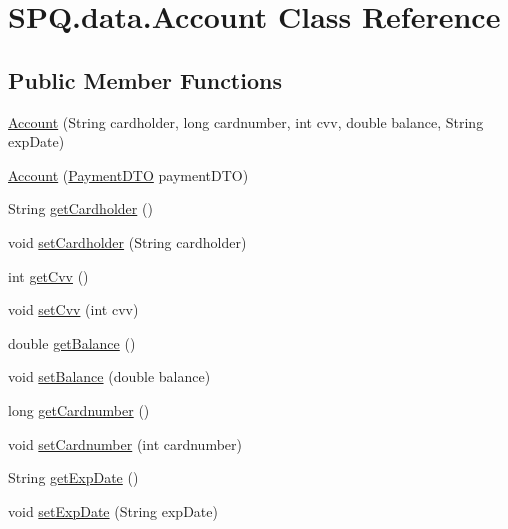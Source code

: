 \hypertarget{class_s_p_q_1_1data_1_1_account}{}\section{S\+P\+Q.\+data.\+Account Class Reference}
\label{class_s_p_q_1_1data_1_1_account}
\subsection*{Public Member Functions}
\begin{DoxyCompactItemize}
\item 
\mbox{\hyperlink{class_s_p_q_1_1data_1_1_account_a11f422d8f96b08c185afde5c34e67f01}{Account}} (String cardholder, long cardnumber, int cvv, double balance, String exp\+Date)
\item 
\mbox{\hyperlink{class_s_p_q_1_1data_1_1_account_a0d4661bfe533c8e38fc996747f3a4952}{Account}} (\mbox{\hyperlink{class_s_p_q_1_1dto_1_1_payment_d_t_o}{Payment\+D\+TO}} payment\+D\+TO)
\item 
String \mbox{\hyperlink{class_s_p_q_1_1data_1_1_account_ab4297cf24cbff2975364306a31e75db9}{get\+Cardholder}} ()
\item 
void \mbox{\hyperlink{class_s_p_q_1_1data_1_1_account_a4298cea2ae84ed5eae60f67fe61e433a}{set\+Cardholder}} (String cardholder)
\item 
int \mbox{\hyperlink{class_s_p_q_1_1data_1_1_account_a6f30fcec03cf6e342b7c6d932166ebb1}{get\+Cvv}} ()
\item 
void \mbox{\hyperlink{class_s_p_q_1_1data_1_1_account_a572b5452dceb62eea2d1f63b6df90be7}{set\+Cvv}} (int cvv)
\item 
double \mbox{\hyperlink{class_s_p_q_1_1data_1_1_account_a39cb32b817edf85d7cf23d9b39bb0dc5}{get\+Balance}} ()
\item 
void \mbox{\hyperlink{class_s_p_q_1_1data_1_1_account_a7ac2f177ba411765320259ed3a63b5b2}{set\+Balance}} (double balance)
\item 
long \mbox{\hyperlink{class_s_p_q_1_1data_1_1_account_a54797a8ae92cb43fa9126700579ca9bf}{get\+Cardnumber}} ()
\item 
void \mbox{\hyperlink{class_s_p_q_1_1data_1_1_account_afad9822abc150e4238b95280647d3e11}{set\+Cardnumber}} (int cardnumber)
\item 
String \mbox{\hyperlink{class_s_p_q_1_1data_1_1_account_a6980881f5f4cd0af58f6ccdc8d6916fc}{get\+Exp\+Date}} ()
\item 
void \mbox{\hyperlink{class_s_p_q_1_1data_1_1_account_a4c4a9c7f817a565893668bcc634ec143}{set\+Exp\+Date}} (String exp\+Date)
\end{DoxyCompactItemize}


